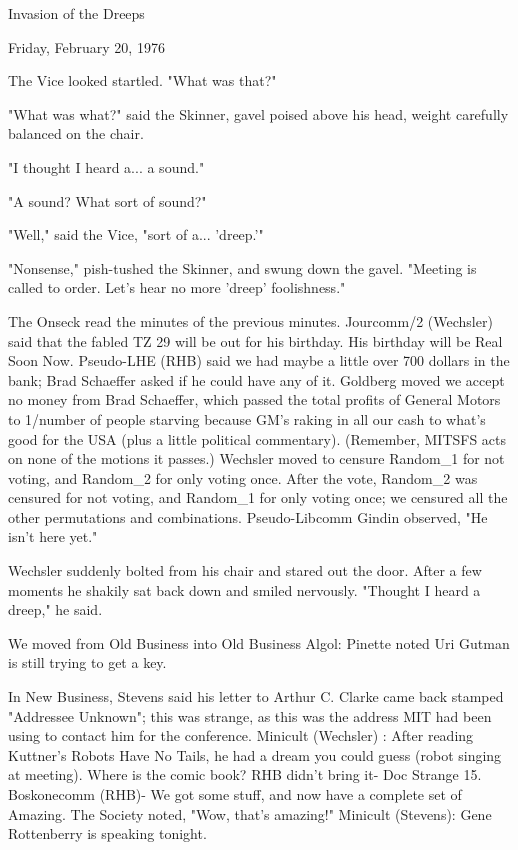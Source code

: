 \documentclass[12pt]{article}
\begin{document}
\begin{center}

Invasion of the Dreeps

Friday, February 20, 1976

\end{center}
 
\vspace{12pt}

\setlength{\parskip}{6pt}

\noindent
The Vice looked startled. "What was that?"

"What was what?" said the Skinner, gavel poised above his head, weight carefully balanced on the chair.

"I thought I heard a... a sound."

"A sound? What sort of sound?"

"Well," said the Vice, "sort of a... 'dreep.'"

"Nonsense," pish-tushed the Skinner, and swung down the gavel. "Meeting is called to order. Let's hear no more 'dreep' foolishness."

The Onseck read the minutes of the previous minutes. Jourcomm/2 (Wechsler) said that the fabled TZ 29 will be out for his birthday. His birthday will be Real Soon Now. Pseudo-LHE (RHB) said we had maybe a little over 700 dollars in the bank; Brad Schaeffer asked if he could have any of it. Goldberg moved we accept no money from Brad Schaeffer, which passed the total profits of General Motors to 1/number of people starving because GM's raking in all our cash to what's good for the USA (plus a little political commentary). (Remember, MITSFS acts on none of the motions it passes.) Wechsler moved to censure Random_1 for not voting, and Random_2 for only voting once. After the vote, Random_2 was censured for not voting, and Random_1 for only voting once; we censured all the other permutations and combinations. Pseudo-Libcomm Gindin observed, "He isn't here yet."

Wechsler suddenly bolted from his chair and stared out the door. After a few moments he shakily sat back down and smiled nervously. "Thought I heard a dreep," he said.

We moved from Old Business into Old Business Algol: Pinette
noted Uri Gutman is still trying to get a key.

In New Business, Stevens said his letter to Arthur C. Clarke came back stamped "Addressee Unknown"; this was strange, as this was the address MIT had been using to contact him for the conference. Minicult (Wechsler) : After reading Kuttner's Robots Have No Tails, he had a dream you could guess (robot singing at meeting). Where is the comic book? RHB didn't bring it- Doc Strange 15. Boskonecomm (RHB)- We got some stuff, and now have a complete set of Amazing. The Society noted, "Wow, that's amazing!" Minicult (Stevens): Gene Rottenberry is speaking tonight.
\end{document}
